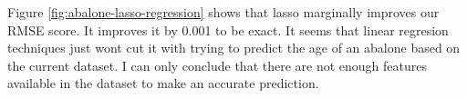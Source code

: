 Figure \ref{fig:abalone-lasso-regression} shows that lasso marginally improves our RMSE score. It improves it by 0.001 to be exact. 
It seems that linear regresion techniques just wont cut it with trying to predict the age of an abalone based on the current dataset. I can only conclude that there are not enough features available in the dataset to make an accurate prediction.